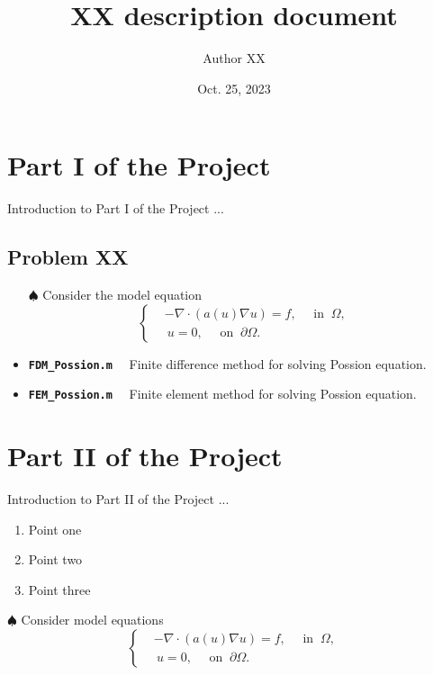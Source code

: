 \documentclass[11pt]{article}
\title{XX description document}
\author{Author XX}
\date{Oct. 25, 2023}
\newcommand{\textcode}[1]{\textcolor{winered}{\bfseries\texttt{#1}}~~}
\begin{document}
\maketitle


\section{Part I of the Project}

Introduction to Part I of the Project ...

\subsection{Problem XX}

\begin{itemize}
\setlength{\itemsep}{3pt}
\item [$\spadesuit$] Consider the model equation
\begin{equation}\label{eq:NLPossion4}
\left\{
\begin{aligned}
&-\nabla \cdot(a(u) \nabla u) = f,\quad \text{ in } ~\Omega, \\
&~u = 0, \quad \text{ on } ~ \partial \Omega.
\end{aligned}\right.
\end{equation}

\item \textcode{FDM\_Possion.m} Finite difference method for solving Possion equation.

\item \textcode{FEM\_Possion.m} Finite element method for solving Possion equation.

\end{itemize}


\section{Part II of the Project}

Introduction to Part II of the Project ...

\begin{enumerate}
\setlength{\itemsep}{3pt}
  \item Point one
  \item Point two
  \item Point three
\end{enumerate}



\medskip
\noindent $\spadesuit$ Consider model equations
\begin{equation}\label{eq:NLPossion4}
\left\{
\begin{aligned}
&-\nabla \cdot(a(u) \nabla u) = f,\quad \text{ in } ~\Omega, \\
&~u = 0, \quad \text{ on } ~ \partial \Omega.
\end{aligned}\right.
\end{equation}
\end{document}

